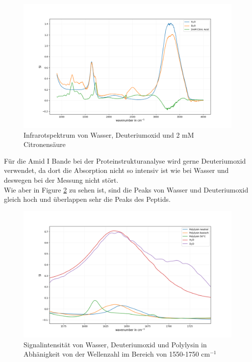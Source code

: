 \documentclass[10pt,a4paper]{article}
\begin{document}
			\begin{figure}[H]
				\centering
				\includegraphics[scale=0.55]{water_citricacid.png}
				\caption{Infrarotspektrum von Wasser, Deuteriumoxid und 2 mM Citronensäure}
				\label{fig:wasser_Citrat_full}
			\end{figure}
			
			Für die Amid I Bande bei der Proteinstrukturanalyse wird gerne Deuteriumoxid verwendet, da dort die Absorption nicht so intensiv ist wie bei Wasser und deswegen bei der Messung nicht stört.\\
			Wie aber in Figure \ref{fig:water_polylysin_full} zu sehen ist, sind die Peaks von Wasser und Deuteriumoxid gleich hoch und überlappen sehr die Peaks des Peptids.\\
			
			\begin{figure}[H]
				\centering
				\includegraphics[scale=0.55]{water_polylysin.png}
				\caption{Signalintensität von Wasser, Deuteriumoxid und Polylysin in Abhänigkeit von der Wellenzahl im Bereich von 1550-1750 cm$^{-1}$}
				\label{fig:water_polylysin_full}
			\end{figure}
			
\end{document}
